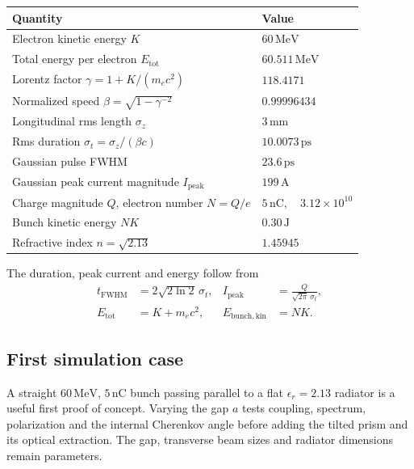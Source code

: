 \documentclass[11pt,a4paper]{article}
\newcommand{\unit}[1]{\,\mathrm{#1}}
\numberwithin{equation}{section}
\begin{document}
\begin{center}
\renewcommand{\arraystretch}{1.14}
\begin{tabularx}{\linewidth}{@{}Y l@{}}
\toprule
Quantity & Value\\
\midrule
Electron kinetic energy \(K\) & \(60\unit{MeV}\)\\
Total energy per electron \(E_{\mathrm{tot}}\) & \(60.511\unit{MeV}\)\\
Lorentz factor \(\gamma=1+K/(m_ec^2)\) & \(118.4171\)\\
Normalized speed \(\beta=\sqrt{1-\gamma^{-2}}\) & \(0.99996434\)\\
Longitudinal rms length \(\sigma_z\) & \(3\unit{mm}\)\\
Rms duration \(\sigma_t=\sigma_z/(\beta c)\) & \(10.0073\unit{ps}\)\\
Gaussian pulse FWHM & \(23.6\unit{ps}\)\\
Gaussian peak current magnitude \(I_{\mathrm{peak}}\) & \(199\unit{A}\)\\
Charge magnitude \(Q\), electron number \(N=Q/e\) &
\(5\unit{nC},\quad 3.12\times10^{10}\)\\
Bunch kinetic energy \(NK\) & \(0.30\unit{J}\)\\
Refractive index \(n=\sqrt{2.13}\) & \(1.45945\)\\
\bottomrule
\end{tabularx}
\end{center}

The duration, peak current and energy follow from
\begin{align}
 t_{\mathrm{FWHM}}&=2\sqrt{2\ln2}\,\sigma_t,&
 I_{\mathrm{peak}}&=\frac{Q}{\sqrt{2\pi}\,\sigma_t},\\
 E_{\mathrm{tot}}&=K+m_ec^2,&
 E_{\mathrm{bunch,kin}}&=NK.
\end{align}

\subsection{First simulation case}

A straight \(60\unit{MeV}\), \(5\unit{nC}\) bunch passing parallel to a flat
\(\epsilon_r=2.13\) radiator is a useful first proof of concept. Varying the
gap \(a\) tests coupling, spectrum, polarization and the internal Cherenkov
angle before adding the tilted prism and its optical extraction.
The gap, transverse beam sizes and radiator dimensions remain parameters.
\end{document}
